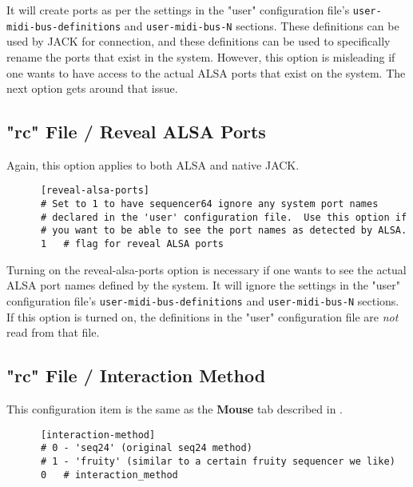    It will create ports as per the settings in the "user" configuration file's
   \texttt{user-midi-bus-definitions} and \texttt{user-midi-bus-N} sections.
   These definitions can be used by JACK for connection, and these definitions
   can be used to specifically rename the ports that exist in the system.
   However, this option is misleading if one wants to have access to the
   actual ALSA ports that exist on the system.
   The next option gets around that issue.

\subsection{"rc" File / Reveal ALSA Ports}
\label{subsec:seq64_rc_file_reveal_ports}

   Again, this option applies to both ALSA and native JACK.

   \begin{verbatim}
      [reveal-alsa-ports]
      # Set to 1 to have sequencer64 ignore any system port names
      # declared in the 'user' configuration file.  Use this option if
      # you want to be able to see the port names as detected by ALSA.
      1   # flag for reveal ALSA ports
   \end{verbatim}

   Turning on the reveal-alsa-ports option is necessary if one
   wants to see the actual ALSA port names defined by the system.
   It will ignore the settings in the "user" configuration file's
   \texttt{user-midi-bus-definitions} and \texttt{user-midi-bus-N} sections.
   If this option is turned on, the definitions in the
   "user" configuration file are \textsl{not} read from that file.

\subsection{"rc" File / Interaction Method}
\label{subsec:seq64_rc_file_interaction}

   This configuration item is the same as the 
   \textbf{Mouse} tab described in
   .

   \begin{verbatim}
      [interaction-method]
      # 0 - 'seq24' (original seq24 method)
      # 1 - 'fruity' (similar to a certain fruity sequencer we like)
      0   # interaction_method
   \end{verbatim}

